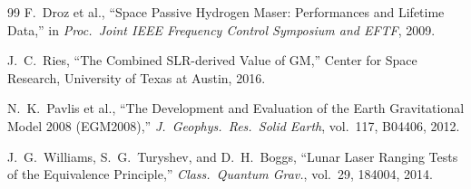\documentclass[11pt,a4paper]{article}
\begin{document}
\begin{thebibliography}{99}
F.~Droz et al., ``Space Passive Hydrogen Maser: Performances and Lifetime Data,'' in \emph{Proc.\ Joint IEEE Frequency Control Symposium and EFTF}, 2009.

J.~C.~Ries, ``The Combined SLR-derived Value of GM,'' Center for Space Research, University of Texas at Austin, 2016.

N.~K.~Pavlis et al., ``The Development and Evaluation of the Earth Gravitational Model 2008 (EGM2008),'' \emph{J.\ Geophys.\ Res.\ Solid Earth}, vol.~117, B04406, 2012.

J.~G.~Williams, S.~G.~Turyshev, and D.~H.~Boggs, ``Lunar Laser Ranging Tests of the Equivalence Principle,'' \emph{Class.\ Quantum Grav.}, vol.~29, 184004, 2014.

\end{thebibliography}
\end{document}
